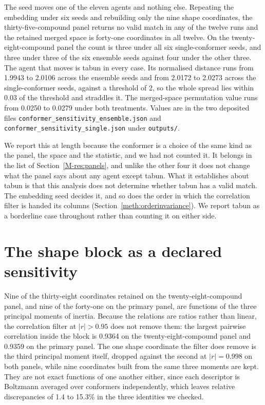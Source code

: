 \documentclass[journal=jacsat,manuscript=suppinfo,margin=1in]{achemso}
\begin{document}
The seed moves one of the eleven agents and nothing else. Repeating the
embedding under six seeds and rebuilding only the nine shape coordinates, the
thirty-five-compound panel returns no valid match in any of the twelve runs and
the retained merged space is forty-one coordinates in all twelve. On the
twenty-eight-compound panel the count is three under all six single-conformer
seeds, and three under three of the six ensemble seeds against four under the
other three. The agent that moves is tabun in every case. Its normalised
distance runs from 1.9943 to 2.0106 across the ensemble seeds and from 2.0172 to
2.0273 across the single-conformer seeds, against a threshold of 2, so the whole
spread lies within 0.03 of the threshold and straddles it. The merged-space
permutation value runs from 0.0250 to 0.0279 under both treatments. Values are
in the two deposited files
\texttt{conformer\_sensitivity\_ensemble.json} and
\texttt{conformer\_sensitivity\_single.json} under \texttt{outputs/}.

We report this at length because the conformer is a choice of the same kind as
the panel, the space and the statistic, and we had not counted it. It belongs in
the list of Section~\ref{M-res:panels}, and unlike the other four it does not
change what the panel says about any agent except tabun. What it establishes
about tabun is that this analysis does not determine whether tabun has a valid
match. The embedding seed decides it, and so does the order in which the
correlation filter is handed its columns
(Section~\ref{meth:orderinvariance}). We report tabun as a borderline case
throughout rather than counting it on either side.

\section{The shape block as a declared sensitivity}
\label{res:shapeblock}

Nine of the thirty-eight coordinates retained on the twenty-eight-compound
panel, and nine of the forty-one on the primary panel, are functions of the
three principal moments of inertia. Because the relations are ratios rather
than linear, the correlation filter at $|r| > 0.95$ does not remove them: the
largest pairwise correlation inside the block is 0.9364 on the
twenty-eight-compound panel and 0.9359 on the primary panel. The one shape
coordinate the filter does remove is the third principal moment itself,
dropped against the second at $|r| = 0.998$ on both panels, while nine
coordinates built from the same three moments are kept. They are not exact
functions of one another either, since each descriptor is Boltzmann averaged
over conformers independently, which leaves relative discrepancies of 1.4 to
15.3\% in the three identities we checked.
\end{document}
